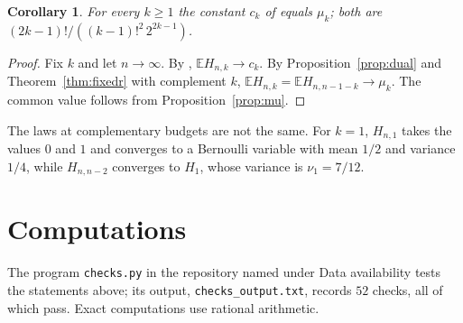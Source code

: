 \documentclass[11pt]{amsart}
\newtheorem{corollary}[theorem]{Corollary}
\theoremstyle{remark}
\numberwithin{equation}{section}
\newcommand{\E}{\mathbb E}
\newcommand{\1}{\mathbf 1}
\begin{document}
\begin{corollary}\label{cor:ck}
For every $k\ge1$ the constant $c_k$ of \cite[Theorem~7]{DS} equals $\mu_k$; both are $(2k-1)!/((k-1)!^2\,2^{2k-1})$.
\end{corollary}

\begin{proof}
Fix $k$ and let $n\to\infty$. By \cite[Theorem~7]{DS}, $\E H_{n,k}\to c_k$. By Proposition~\ref{prop:dual} and Theorem~\ref{thm:fixedr} with complement $k$, $\E H_{n,k}=\E H_{n,n-1-k}\to\mu_k$. The common value follows from Proposition~\ref{prop:mu}.
\end{proof}

The laws at complementary budgets are not the same. For $k=1$, $H_{n,1}$ takes the values $0$ and $1$ and converges to a Bernoulli variable with mean $1/2$ and variance $1/4$, while $H_{n,n-2}$ converges to $H_1$, whose variance is $\nu_1=7/12$.

\section{Computations}\label{sec:comp}

The program \texttt{checks.py} in the repository named under Data availability tests the statements above; its output, \texttt{checks\_output.txt}, records $52$ checks, all of which pass. Exact computations use rational arithmetic.
\end{document}
